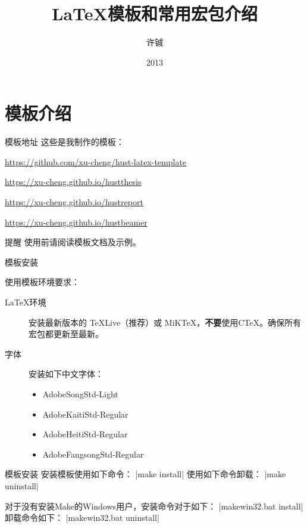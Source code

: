 \documentclass[langauge=chinese]{hustbeamer}
\title{\LaTeX{}模板和常用宏包介绍}
\author{许铖}
\institute{\email{xucheng@hust.edu.cn}}
\date{2013}{11}{21}
\begin{document}
\maketitle
\PrintTOC

\section{模板介绍}

\begin{frame}[fragile]{\secname}{模板地址}
这些是我制作的模板：

\noindent\url{https://github.com/xu-cheng/hust-latex-template}

\begin{description}
\footnotesize
    \item[hustthesis] \url{https://xu-cheng.github.io/hustthesis}
    \item[hustreport] \url{https://xu-cheng.github.io/hustreport}
    \item[hustbeamer] \url{https://xu-cheng.github.io/hustbeamer}
\end{description}

\begin{block}{提醒}
使用前请阅读模板文档及示例。
\end{block}
\end{frame}

\begin{frame}[fragile]{\secname}{模板安装}

{\Large 使用模板环境要求：}
\begin{description}
    \item[\LaTeX{}环境] 安装最新版本的 TeXLive（推荐）或 MiKTeX，\newline\textbf{不要}使用CTeX。确保所有宏包都更新至最新。
    \item[字体] 安装如下中文字体：\\
    \begin{itemize}
        \item AdobeSongStd-Light
        \item AdobeKaitiStd-Regular
        \item AdobeHeitiStd-Regular
        \item AdobeFangsongStd-Regular
    \end{itemize}
\end{description}

\end{frame}

\begin{frame}[fragile]{\secname}{模板安装}
安装模板使用如下命令：
 |make install|
使用如下命令卸载：
 |make uninstall|

对于没有安装Make的Windows用户，安装命令对于如下：
 |makewin32.bat install|
卸载命令如下：
 |makewin32.bat uninstall|
\end{frame}
\end{document}
